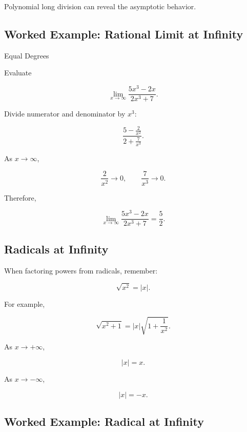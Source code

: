 Polynomial long division can reveal the asymptotic behavior.

\subsection{Worked Example: Rational Limit at Infinity}
\label{subsec:worked-rational-infinity}

\begin{workedexamplebox}{Equal Degrees}

Evaluate

\[
\lim_{x\to\infty}
\frac{
5x^3-2x
}{
2x^3+7
}.
\]

Divide numerator and denominator by \(x^3\):

\[
\frac{
5-\frac{2}{x^2}
}{
2+\frac{7}{x^3}
}.
\]

As \(x\to\infty\),

\[
\frac{2}{x^2}\to0,
\qquad
\frac{7}{x^3}\to0.
\]

Therefore,

\begin{answerbox}
\[
\boxed{
\lim_{x\to\infty}
\frac{
5x^3-2x
}{
2x^3+7
}
=
\frac52.
}
\]
\end{answerbox}

\end{workedexamplebox}

\subsection{Radicals at Infinity}
\label{subsec:radicals-at-infinity}

When factoring powers from radicals, remember:

\[
\boxed{
\sqrt{x^2}=|x|.
}
\]

For example,

\[
\sqrt{x^2+1}
=
|x|
\sqrt{
1+\frac1{x^2}
}.
\]

As \(x\to+\infty\),

\[
|x|=x.
\]

As \(x\to-\infty\),

\[
|x|=-x.
\]

\subsection{Worked Example: Radical at Infinity}
\label{subsec:worked-radical-infinity}

